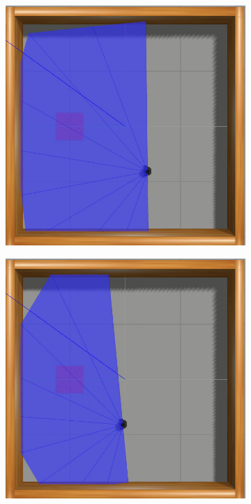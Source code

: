 \begin{figure}[htbp]
\begin{subfigure}[b]{0.115\textwidth}
    \end{subfigure}
    \hfill
    \begin{subfigure}[b]{0.115\textwidth}
        \includegraphics[width=\textwidth]{images/simenv1/3.png}
    \end{subfigure}
    \hfill
    \begin{subfigure}[b]{0.115\textwidth}
        \includegraphics[width=\textwidth]{images/simenv1/4.png}

\end{subfigure}
\end{figure}
